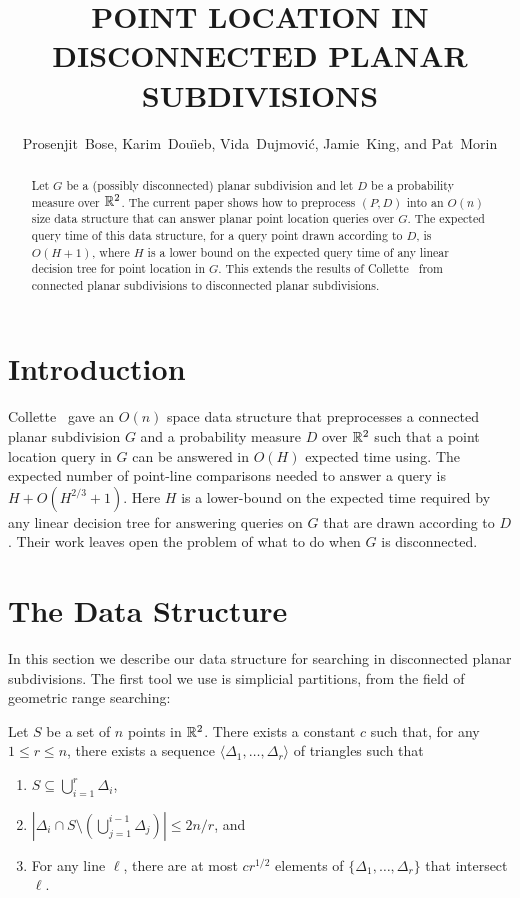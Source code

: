 \documentclass{patmorin}
\title{\MakeUppercase{Point Location in Disconnected Planar Subdivisions}}
\author{Prosenjit~Bose, 
	Karim~Dou\"{\i}eb, 
	Vida~Dujmovi\'c, 
	Jamie~King, and 
	Pat~Morin}
\begin{document}
\maketitle

\begin{abstract}
Let $G$ be a (possibly disconnected) planar subdivision and let $D$
be a probability measure over $\mathbb{R}^2$.  The current paper shows how to
preprocess $(P,D)$ into an $O(n)$ size data structure that can answer
planar point location queries over $G$.  The expected query time of this
data structure, for a query point drawn according to $D$, is $O(H+1)$,
where $H$ is a lower bound on the expected query time of any linear
decision tree for point location in $G$.
This extends the results of Collette \etal\ from connected planar
subdivisions to disconnected planar subdivisions.
\end{abstract}

\section{Introduction}


Collette \etal\ gave an $O(n)$ space data structure that preprocesses
a connected planar subdivision $G$ and a probability measure $D$
over $\mathbb{R}^2$ such that a point location query in $G$ can be answered
in $O(H)$ expected time using.  The expected number of point-line
comparisons needed to answer a query is $H + O(H^{2/3}+1)$.  Here $H$
is a lower-bound on the expected time required by any linear decision
tree for answering queries on $G$ that are drawn according to $D$. Their
work leaves open the problem of what to do when $G$ is disconnected.


\section{The Data Structure}

In this section we describe our data structure for searching in
disconnected planar subdivisions.  The first tool we use is simplicial
partitions, from the field of geometric range searching:

\begin{thm}[Matou\v{s}ek 1991]
Let $S$ be a set of $n$ points in $\mathbb{R}^2$. There exists a constant
$c$ such that, for any $1\le r \le n$, there exists a sequence
$\langle \Delta_1,\ldots,\Delta_r\rangle$ of triangles such that
  \begin{enumerate}
    \item $S\subseteq \bigcup_{i=1}^r \Delta_i$,
  
    \item $\left|\Delta_i \cap S\setminus
    \left(\bigcup_{j=1}^{i-1}\Delta_j\right)\right| \le 2n/r$, and
  
    \item For any line $\ell$, there are at most $cr^{1/2}$ elements of
  $\{\Delta_1,\ldots,\Delta_r\}$ that intersect $\ell$.
  \end{enumerate}
\end{thm}
\end{document}
